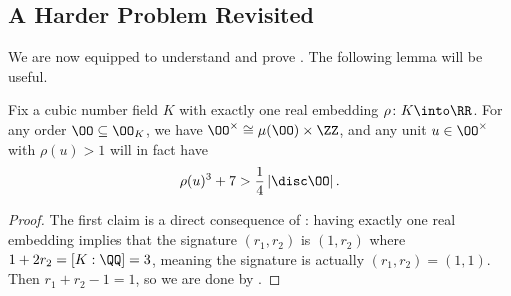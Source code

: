 \documentclass[../notes.tex]{subfiles}
\begin{document}
\subsection{A Harder Problem Revisited}
We are now equipped to understand and prove . The following lemma will be useful.
\begin{lemma} \label{lem:cubic-fund-unit}
	Fix a cubic number field $K$ with exactly one real embedding $\rho\colon K\into\RR$. For any order $\OO\subseteq\OO_K$, we have $\OO^\times\cong\mu(\OO)\times\ZZ$, and any unit $u\in\OO^\times$ with $\rho(u)>1$ will in fact have
	\[\rho(u)^3+7>\frac14\left|\disc\OO\right|.\]
\end{lemma}
\begin{proof}
	The first claim is a direct consequence of : having exactly one real embedding implies that the signature $(r_1,r_2)$ is $(1,r_2)$ where $1+2r_2=[K:\QQ]=3$, meaning the signature is actually $(r_1,r_2)=(1,1)$. Then $r_1+r_2-1=1$, so we are done by .


\end{proof}
\end{document}
